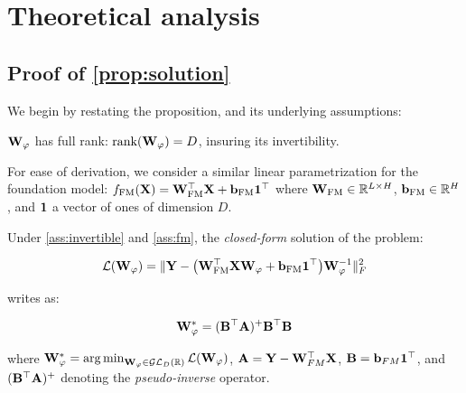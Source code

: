\section{Theoretical analysis}
\label{appendix:theory}

\subsection{Proof of \cref{prop:solution}}
\label{appendix:solution_proof}
We begin by restating the proposition, and its underlying assumptions:

\begin{assumption}
$\mathbf{W}_{\varphi}$ has full rank: $\text{rank}(\mathbf{W}_{\varphi}) = D$, insuring its invertibility.
\end{assumption}

\begin{assumption}
For ease of derivation, we consider a similar linear parametrization for the foundation model: $f_{\mathrm{FM}}(\mathbf{X}) =  \mathbf{W}_{\text{FM}}^\top \mathbf{X} + {\bf b}_{\text{FM}} \mathbf{1}^\top$ where $\mathbf{W}_{\text{FM}} \in \mathbb{R}^{L \times H}$, ${\bf b}_{\text{FM}} \in \mathbb{R}^H$, and $\mathbf{1}$ a vector of ones of dimension $D$.
\end{assumption}

\begin{proposition}
Under \cref{ass:invertible} and \cref{ass:fm}, the \emph{closed-form} solution of the problem: 

\begin{equation}
    \mathcal{L} (\mathbf{W}_{\varphi}) = \|\mathbf{Y} - \big( \mathbf{W}_{\text{FM}}^\top \mathbf{X} \mathbf{W}_{\varphi} + {\bf b}_{\text{FM}} \mathbf{1}^\top \big) \mathbf{W}_{\varphi}^{-1}\|_F^2
\end{equation}

writes as:

\begin{equation}
    \mathbf{W}_{\varphi}^* = ({\bf B}^\top \mathbf{A})^{+} {\bf B}^\top {\bf B}
\end{equation}

where $\mathbf{W}_{\varphi}^* = \operatorname*{arg\,min}_{\mathbf{W}_{\varphi} \in \mathcal{GL}_D(\mathbb{R})} \mathcal{L} (\mathbf{W}_{\varphi})$, $\mathbf{A} = \mathbf{Y} -  \mathbf{W}_{FM}^\top \mathbf{X}$, ${\bf B} = {\bf b}_{FM} \mathbf{1}^\top$, and $({\bf B}^{\top} \mathbf{A})^{+}$ denoting the \emph{pseudo-inverse} operator.

\end{proposition}

